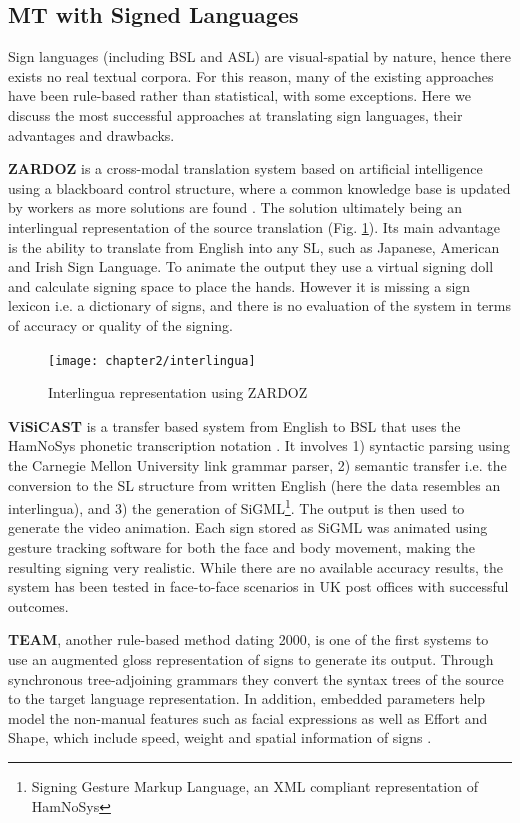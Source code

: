 \documentclass[12pt]{ociamthesis}  %
\begin{document}
\subsection{MT with Signed Languages}
\label{existing methods}
Sign languages (including BSL and ASL) are visual-spatial by nature, hence there exists no real textual corpora. For this reason, many of the existing approaches have been rule-based rather than statistical, with some exceptions. Here we discuss the most successful approaches at translating sign languages, their advantages and drawbacks. 

\textbf{ZARDOZ} is a cross-modal translation system based on artificial intelligence using a blackboard control structure, where a common knowledge base is updated by workers as more solutions are found . The solution ultimately being an interlingual representation of the source translation (Fig. \ref{fig:zardoz}). Its main advantage is the ability to translate from English into any SL, such as Japanese, American and Irish Sign Language. To animate the output they use a virtual signing doll and calculate signing space to place the hands. However it is missing a sign lexicon i.e. a dictionary of signs, and there is no evaluation of the system in terms of accuracy or quality of the signing.
\begin{figure}[h]
	\centering
    \texttt{[image: chapter2/interlingua]}
    \caption{Interlingua representation using ZARDOZ}
    \label{fig:zardoz}
\end{figure}

\textbf{ViSiCAST} is a transfer based system from English to BSL that uses the HamNoSys phonetic transcription notation . It involves 1) syntactic parsing using the Carnegie Mellon University link grammar parser, 2) semantic transfer i.e. the conversion to the SL structure from written English (here the data resembles an interlingua), and 3) the generation of SiGML\footnote{Signing Gesture Markup Language, an XML compliant representation of HamNoSys}. The output is then used to generate the video animation. Each sign stored as SiGML was animated using gesture tracking software for both the face and body movement, making the resulting signing very realistic. While there are no available accuracy results, the system has been tested in face-to-face scenarios in UK post offices with successful outcomes.

\textbf{TEAM}, another rule-based method dating 2000, is one of the first systems to use an augmented gloss representation of signs to generate its output. Through synchronous tree-adjoining grammars they convert the syntax trees of the source to the target language representation. In addition, embedded parameters help model the non-manual features such as facial expressions as well as Effort and Shape, which include speed, weight and spatial information of signs . 
\end{document}
